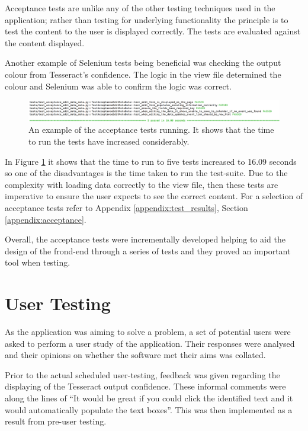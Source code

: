 Acceptance tests are unlike any of the other testing techniques used in the application; rather than testing for underlying functionality the principle is to test the content to the user is displayed correctly. The tests are evaluated against the content displayed.

Another example of Selenium tests being beneficial was checking the output colour from Tesseract's confidence. The logic in the view file determined the colour and Selenium was able to confirm the logic was correct.

\begin{figure}[h!]
  \centering
  \includegraphics[width=\textwidth]{images/acceptance_test_1}
  \caption{An example of the acceptance tests running. It shows that the time to run the tests have increased considerably.}
  \label{fig:acceptance_test_1}
\end{figure}

In Figure \ref{fig:acceptance_test_1} it shows that the time to run to five tests increased to 16.09 seconds so one of the disadvantages is the time taken to run the test-suite. Due to the complexity with loading data correctly to the view file, then these tests are imperative to ensure the user expects to see the correct content. For a selection of acceptance tests refer to Appendix \ref{appendix:test_results}, Section \ref{appendix:acceptance}.

Overall, the acceptance tests were incrementally developed helping to aid the design of the frond-end through a series of tests and they proved an important tool when testing.

\section{User Testing}
As the application was aiming to solve a problem, a set of potential users were asked to perform a user study of the application. Their responses were analysed and their opinions on whether the software met their aims was collated.

Prior to the actual scheduled user-testing, feedback was given regarding the displaying of the Tesseract output confidence. These informal comments were along the lines of ``It would be great if you could click the identified text and it would automatically populate the text boxes''. This was then implemented as a result from pre-user testing.

